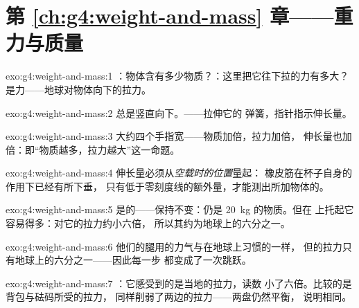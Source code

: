 \section*{第 \ref{ch:g4:weight-and-mass} 章——重力与质量}

\begin{solution}{exo:g4:weight-and-mass:1}
：物体含有多少物质？：这里把它往下拉的力有多大？
是力——地球对物体向下的拉力。
\end{solution}

\begin{solution}{exo:g4:weight-and-mass:2}
总是竖直向下。——拉伸它的
弹簧，指针指示伸长量。
\end{solution}

\begin{solution}{exo:g4:weight-and-mass:3}
大约四个手指宽——物质加倍，拉力加倍，
伸长量也加倍：即“物质越多，拉力越大”这一命题。
\end{solution}

\begin{solution}{exo:g4:weight-and-mass:4}
伸长量必须从\emph{空载时的位置}量起：
橡皮筋在杯子自身的作用下已经有所下垂，
只有低于零刻度线的额外量，才能测出所加物体的。
\end{solution}

\begin{solution}{exo:g4:weight-and-mass:5}
是的——保持不变：仍是 \qty{20}{kg} 的物质。但在
上托起它容易得多：对它的拉力约小六倍，
所以其约为地球上的六分之一。
\end{solution}

\begin{solution}{exo:g4:weight-and-mass:6}
他们的腿用的力气与在地球上习惯的一样，
但的拉力只有地球上的六分之一——因此每一步
都变成了一次跳跃。
\end{solution}

\begin{solution}{exo:g4:weight-and-mass:7}
：它感受到的是当地的拉力，读数
小了六倍。比较的是背包与砝码所受的拉力，
同样削弱了两边的拉力——两盘仍然平衡，
说明相同。
\end{solution}

